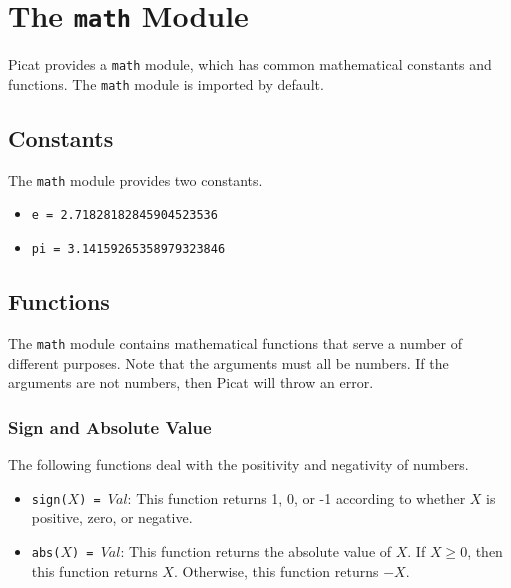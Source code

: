 \appendix
\chapter{The \texttt{math} Module}\label{chapter:math}
Picat provides a \texttt{math} module, which has common mathematical constants and functions.  The \texttt{math} module is imported by default.


\section{Constants}
The \texttt{math} module provides two constants.
\begin{itemize}
\item \texttt{e = 2.71828182845904523536}
\item \texttt{pi = 3.14159265358979323846}
\end{itemize}

\section{Functions}
The \texttt{math} module contains mathematical functions that serve a number of different purposes.  Note that the arguments must all be numbers.  If the arguments are not numbers, then Picat will throw an error.

\subsection{Sign and Absolute Value}
The following functions deal with the positivity and negativity of numbers.
\begin{itemize}
\item \texttt{sign($X$) = $Val$}: This function returns 1, 0, or -1 according to whether $X$ is positive, zero, or negative.
\item \texttt{abs($X$) = $Val$}: This function returns the absolute value of $X$.  If $X \ge 0$, then this function returns $X$.  Otherwise, this function returns $-X$.
\end{itemize}

